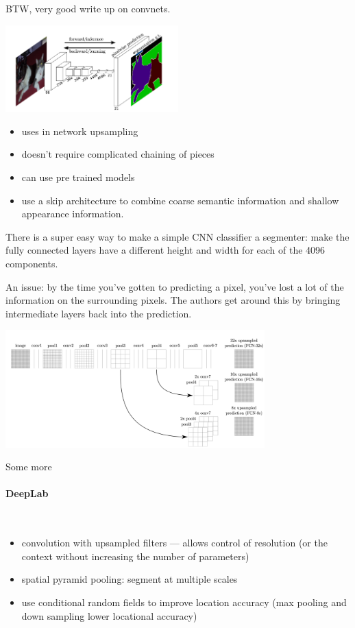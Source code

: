 \documentclass[12pt, a4paper, oneside, headinclude, footinclude]{article}
\begin{document}
BTW, very good write up on convnets.~\cite{long2015fully}

\includegraphics[width=0.5\textwidth]{Figures/long-segmentation.png}
\begin{itemize}
    \item uses in network upsampling
    \item doesn't require complicated chaining of pieces
    \item can use pre trained models
    \item use a skip architecture to combine coarse semantic information and shallow
appearance information.
\end{itemize}
There is a super easy way to make a simple CNN classifier a segmenter: make
the fully connected layers have a different height and width for each of the
4096 components.

An issue: by the time you've gotten to predicting a pixel, you've lost a lot
of the information on the surrounding pixels. The authors get around this by
bringing intermediate layers back into the prediction.

\includegraphics[width=0.75\textwidth]{Figures/skip-segmentation.png}

Some more~\cite{chen2018, NIPS2015_5852}

\paragraph{DeepLab}~\cite{chen2018}

\begin{itemize}
    \item convolution with upsampled filters --- allows control of resolution
        (or the context without increasing the number of parameters)
    \item spatial pyramid pooling: segment at multiple scales
    \item use conditional random fields to improve location accuracy (max
        pooling and down sampling lower locational accuracy)
\end{itemize}
\end{document}
